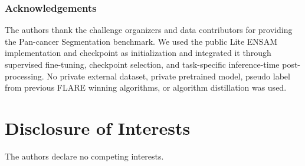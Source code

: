 \documentclass[runningheads]{llncs}
\begin{document}
\subsubsection{Acknowledgements}
The authors thank the challenge organizers and data contributors for providing the Pan-cancer Segmentation benchmark. We used the public Lite ENSAM implementation and checkpoint as initialization and integrated it through supervised fine-tuning, checkpoint selection, and task-specific inference-time post-processing. No private external dataset, private pretrained model, pseudo label from previous FLARE winning algorithms, or algorithm distillation was used.

\section*{Disclosure of Interests}
The authors declare no competing interests.



\end{document}
